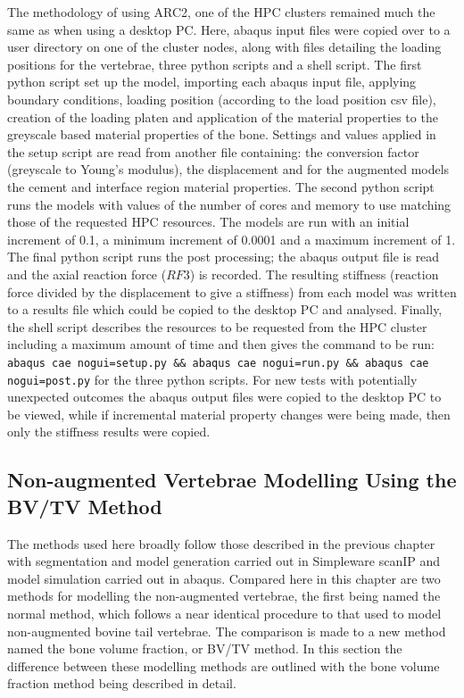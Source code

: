The methodology of using ARC2, one of the HPC clusters remained much the same
as when using a desktop PC. Here, abaqus input files were copied over to a user
directory on one of the cluster nodes, along with files detailing the loading
positions for the vertebrae, three python scripts and a shell script. The first
python script set up the model, importing each abaqus input file, applying
boundary conditions, loading position (according to the load position csv
file), creation of the  loading platen and application of the material
properties to the greyscale based material properties of the bone. Settings and
values applied in the setup script are read from another file containing: the
conversion factor (greyscale to Young's modulus), the displacement and for the augmented models the cement and
interface region material properties. The second python script runs the models
with values of the number of cores and memory to use matching those of the
requested HPC resources. The models are run with an initial increment of 0.1, a
minimum increment of 0.0001 and a maximum increment of 1. The final python
script runs the post processing; the abaqus output file is read and the axial
reaction force ($RF3$) is recorded. The resulting stiffness (reaction force divided by the
displacement to give a stiffness) from each model was written to a results file
which could be copied to the desktop PC and analysed. Finally, the shell script
describes the resources to be requested from the HPC cluster including a
maximum amount of time and then gives the command to be run: \texttt{abaqus cae
nogui=setup.py \&\& abaqus cae nogui=run.py \&\& abaqus cae nogui=post.py} for
the three python scripts. For new tests with potentially unexpected outcomes the abaqus output files were copied
to the desktop PC to be viewed, while if incremental material property changes
were being made, then only the stiffness results were copied.


\subsection{Non-augmented Vertebrae Modelling Using the BV/TV Method}\label{sec:non_aug_sens}

The methods used here broadly follow those described in the previous chapter with segmentation and model generation carried out in Simpleware scanIP and model simulation carried out in abaqus. Compared here in this chapter are two methods for modelling the non-augmented vertebrae, the first being named the normal method, which follows a near identical procedure to that used to model non-augmented bovine tail vertebrae. The comparison is made to a new method named the bone volume fraction, or BV/TV method. In this section the difference between these modelling methods are outlined with the bone volume fraction method being described in detail.

